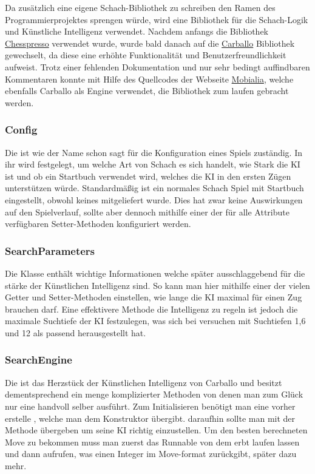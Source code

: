 Da zusätzlich eine eigene Schach-Bibliothek zu schreiben den Ramen des
Programmierprojektes sprengen würde, wird eine Bibliothek für die Schach-Logik
und Künstliche Intelligenz verwendet. Nachdem anfangs die Bibliothek
\href{http://www.chesspresso.org/}{Chesspresso} verwendet wurde, wurde bald
danach auf die \href{https://github.com/albertoruibal/carballo}{Carballo}
Bibliothek gewechselt, da diese eine erhöhte Funktionalität und
Benutzerfreundlichkeit aufweist. Trotz einer fehlenden Dokumentation und nur
sehr bedingt auffindbaren Kommentaren konnte mit Hilfe des Quellcodes der
Webseite \href{https://www.mobialia.com/webchessgwt/}{Mobialia}, welche
ebenfalls Carballo als Engine verwendet, die Bibliothek zum laufen gebracht
werden.

\subsubsection{Config}

Die  ist wie der Name schon sagt für die Konfiguration eines Spiels 
zuständig. In ihr wird festgelegt, um welche Art von Schach es sich handelt, wie 
Stark die KI ist und ob ein Startbuch verwendet wird, welches die KI in den 
ersten Zügen unterstützen würde. Standardmäßig ist  ein normales Schach Spiel 
mit Startbuch eingestellt, obwohl keines mitgeliefert wurde. Dies hat zwar keine 
Auswirkungen auf den Spielverlauf, sollte aber dennoch mithilfe einer der für 
alle Attribute verfügbaren Setter-Methoden konfiguriert werden.

\subsubsection{SearchParameters}

Die Klasse  enthält wichtige Informationen welche später 
ausschlaggebend für die stärke der Künstlichen Intelligenz sind. So kann man 
hier mithilfe einer der vielen Getter und Setter-Methoden einstellen, wie lange 
die KI maximal für einen Zug brauchen darf. Eine effektivere Methode die 
Intelligenz zu regeln ist jedoch die maximale Suchtiefe der KI festzulegen, was 
sich bei versuchen mit Suchtiefen 1,6 und 12 als passend herausgestellt hat.

\subsubsection{SearchEngine}

Die  ist das Herzstück der Künstlichen Intelligenz von 
Carballo und besitzt dementsprechend ein menge komplizierter Methoden von denen 
man zum Glück nur eine handvoll selber ausführt. Zum Initialisieren benötigt man 
eine vorher erstelle , welche man dem Konstruktor übergibt. 
daraufhin sollte man  mit der 
Methode  übergeben um seine KI richtig 
einzustellen. Um den besten berechneten Move zu bekommen muss man zuerst das 
Runnable von dem  erbt laufen lassen und dann 
 aufrufen, was einen Integer im Move-format zurückgibt, 
später dazu mehr.

